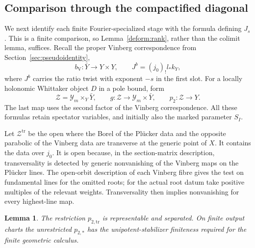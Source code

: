 \documentclass[11pt]{article}
\numberwithin{equation}{section}
\newtheorem{lemma}[theorem]{Lemma}
\theoremstyle{definition}
\theoremstyle{remark}
\begin{document}
\subsection{Comparison through the compactified diagonal}

We next identify each finite Fourier-specialized stage with
the formula defining $J_s$.  This is a finite comparison, so
Lemma~\ref{deform:rank}, rather than the colimit lemma, suffices.
Recall the proper Vinberg correspondence from
Section~\ref{sec:pseudoidentity},
\[
 b_{\mathrm V}:\bar Y\longrightarrow Y\times Y,
 \qquad J^b=(j_0)_!l_*k_Y,
\]
where $J^b$ carries the ratio twist with exponent $-s$ in the
first slot.  For a locally holonomic Whittaker object $D$ in
a pole bound, form
\[
 \mathscr Z=\mathcal Y_m\times_Y\bar Y,
 \qquad g:\mathscr Z\longrightarrow\mathcal Y_m\times\bar Y,
 \qquad p_2:\mathscr Z\longrightarrow Y.
\]
The last map uses the second factor of the Vinberg
correspondence.  All these formulas retain spectator
variables, and initially also the marked parameter $S_I$.

Let $\mathscr Z^{\mathrm{tr}}$ be the open where the Borel of
the Pl\"ucker data and the opposite parabolic of the Vinberg
data are transverse at the generic point of $X$.  It contains
the data over $j_0$.  It is open because, in the section-matrix
description, transversality is detected by generic
nonvanishing of the Vinberg maps on the Pl\"ucker lines.
The open-orbit description of each Vinberg fibre gives the
test on fundamental lines for the omitted roots; for the
actual root datum take positive multiples of the relevant
weights.  Transversality then implies nonvanishing for every
highest-line map.

\begin{lemma}\label{deform:transverse-map}
The restriction $p_{2,\mathrm{tr}}$ is representable and
separated.  On finite output charts the unrestricted
$p_{2,*}$ has the unipotent-stabilizer finiteness required for
the finite geometric calculus.
\end{lemma}
\end{document}
